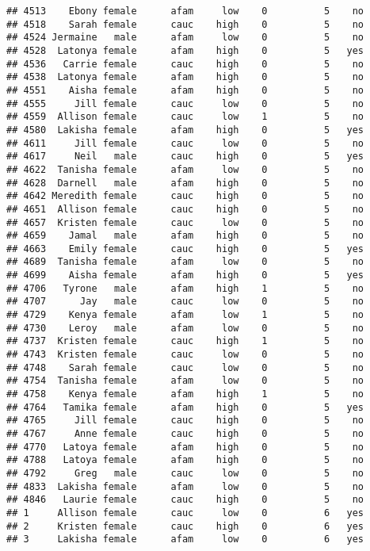 \documentclass[
]{article}
\begin{document}
\begin{verbatim}
## 4513    Ebony female      afam     low    0          5    no
## 4518    Sarah female      cauc    high    0          5    no
## 4524 Jermaine   male      afam     low    0          5    no
## 4528  Latonya female      afam    high    0          5   yes
## 4536   Carrie female      cauc    high    0          5    no
## 4538  Latonya female      afam    high    0          5    no
## 4551    Aisha female      afam    high    0          5    no
## 4555     Jill female      cauc     low    0          5    no
## 4559  Allison female      cauc     low    1          5    no
## 4580  Lakisha female      afam    high    0          5   yes
## 4611     Jill female      cauc     low    0          5    no
## 4617     Neil   male      cauc    high    0          5   yes
## 4622  Tanisha female      afam     low    0          5    no
## 4628  Darnell   male      afam    high    0          5    no
## 4642 Meredith female      cauc    high    0          5    no
## 4651  Allison female      cauc    high    0          5    no
## 4657  Kristen female      cauc     low    0          5    no
## 4659    Jamal   male      afam    high    0          5    no
## 4663    Emily female      cauc    high    0          5   yes
## 4689  Tanisha female      afam     low    0          5    no
## 4699    Aisha female      afam    high    0          5   yes
## 4706   Tyrone   male      afam    high    1          5    no
## 4707      Jay   male      cauc     low    0          5    no
## 4729    Kenya female      afam     low    1          5    no
## 4730    Leroy   male      afam     low    0          5    no
## 4737  Kristen female      cauc    high    1          5    no
## 4743  Kristen female      cauc     low    0          5    no
## 4748    Sarah female      cauc     low    0          5    no
## 4754  Tanisha female      afam     low    0          5    no
## 4758    Kenya female      afam    high    1          5    no
## 4764   Tamika female      afam    high    0          5   yes
## 4765     Jill female      cauc    high    0          5    no
## 4767     Anne female      cauc    high    0          5    no
## 4770   Latoya female      afam    high    0          5    no
## 4788   Latoya female      afam    high    0          5    no
## 4792     Greg   male      cauc     low    0          5    no
## 4833  Lakisha female      afam     low    0          5    no
## 4846   Laurie female      cauc    high    0          5    no
## 1     Allison female      cauc     low    0          6   yes
## 2     Kristen female      cauc    high    0          6   yes
## 3     Lakisha female      afam     low    0          6   yes

\end{verbatim}
\end{document}
